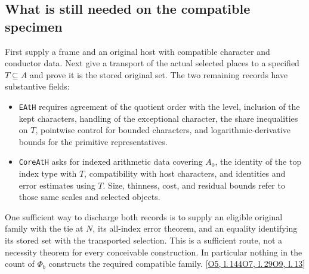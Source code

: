 \documentclass[12pt,letterpaper]{article}
\newcommand{\id}[1]{{\small\nolinkurl{#1}}}
\begin{document}
\subsection*{What is still needed on the compatible specimen}
First supply a frame and an original host with compatible character and conductor data. Next give a transport of the actual selected places to a specified $T\subseteq A$ and prove it is the stored original set. The two remaining records have substantive fields:
\begin{itemize}
\item \id{EAtH} requires agreement of the quotient order with the level, inclusion of the kept characters, handling of the exceptional character, the share inequalities on $T$, pointwise control for bounded characters, and logarithmic-derivative bounds for the primitive representatives.
\item \id{CoreAtH} asks for indexed arithmetic data covering $A_0$, the identity of the top index type with $T$, compatibility with host characters, and identities and error estimates using $T$. Size, thinness, cost, and residual bounds refer to those same scales and selected objects.
\end{itemize}
One sufficient way to discharge both records is to supply an eligible original family with the tie at $N$, its all-index error theorem, and an equality identifying its stored set with the transported selection. This is a sufficient route, not a necessity theorem for every conceivable construction. In particular nothing in the count of $\Phi_b$ constructs the required compatible family. {\footnotesize\sffamily\color{mute}[\href{https://github.com/nousentllc/riemann-hypothesis/blob/40e56bab026552e089d7afcfeff08d2defb9c005/src/Formalism/SharpRestriction/RamificationFrobenius/TotientGaloisClasses/ExplicitFormulaErrorOfHostConditions.lean\#L144}{O5, l.\,144}\enspace \href{https://github.com/nousentllc/riemann-hypothesis/blob/40e56bab026552e089d7afcfeff08d2defb9c005/src/Development/AutomorphicArithmetic/PrimitiveCosets/CoreAtH.lean\#L29}{O7, l.\,29}\enspace \href{https://github.com/nousentllc/riemann-hypothesis/blob/40e56bab026552e089d7afcfeff08d2defb9c005/src/Development/AutomorphicArithmetic/PrimitiveCosets/LevelGmLeOnFamilyScales.lean\#L13}{O9, l.\,13}]}
\end{document}
